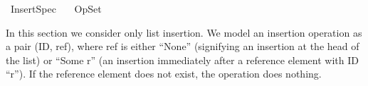%
\begin{isabellebody}%
%
%
\isamarkuptrue%
%
\isadelimtheory
%
\endisadelimtheory
%
\isatagtheory
{}\isamarkupfalse%
\ Insert{\isacharunderscore}Spec\isanewline
\ \ \ OpSet\isanewline
{}%
\endisatagtheory
{\isafoldtheory}%
%
\isadelimtheory
%
\endisadelimtheory
%
\begin{isamarkuptext}%
In this section we consider only list insertion. We model an insertion
operation as a pair (ID, ref), where ref is either ``None'' (signifying an
insertion at the head of the list) or ``Some r'' (an insertion immediately
after a reference element with ID ``r''). If the reference element does not
exist, the operation does nothing.


\end{isamarkuptext}
\end{isabellebody}
